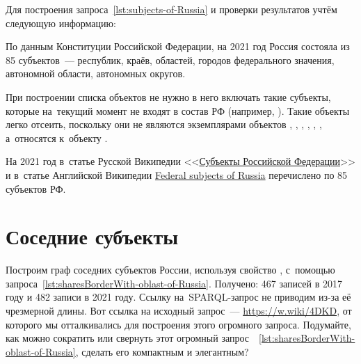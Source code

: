 Для построения запроса~\ref{lst:subjects-of-Russia} и проверки результатов учтём следующую информацию:
\begin{compactitemize}
  \item По данным Конституции Российской Федерации, на 2021 год Россия состояла из 85 субъектов~--- республик, краёв, областей, городов федерального значения, автономной области, автономных округов.
  \item При построении списка объектов не нужно в него включать такие субъекты, 
      которые на~текущий момент не входят в состав РФ (например, ). 
      Такие объекты легко отсеить, поскольку 
        они не являются экземплярами объектов , 
        , 
        , 
        , 
        , 
        , 
      а~относятся к~объекту . 
  \item На 2021 год в~статье Русской Википедии <<\href{https://ru.wikipedia.org/?curid=1042}{Субъекты Российской Федерации}>> 
        и в~статье Английской Википедии 
        \href{https://en.wikipedia.org/wiki/Federal_subjects_of_Russia}{Federal subjects of Russia} 
        перечислено по 85 субъектов РФ.
\end{compactitemize}





\section{Соседние субъекты}

Построим граф соседних субъектов России, используя свойство , 
с~помощью запроса~\ref{lst:sharesBorderWith-oblast-of-Russia}.
Получено: 467 записей в 2017 году 
и 482 записи в 2021 году. Ссылку на~SPARQL-запрос не приводим из-за её чрезмерной длины. 
Вот ссылка на исходный запрос~--- \url{https://w.wiki/4DKD}, 
от которого мы отталкивались для построения этого огромного запроса. 
Подумайте, как можно сократить или свернуть 
этот огромный запрос~~\ref{lst:sharesBorderWith-oblast-of-Russia}, 
сделать его компактным и элегантным?

